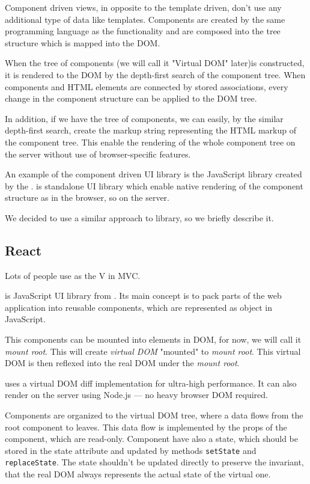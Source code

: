	Component driven views, in opposite to the template driven, don't use any additional type of data like templates. 
	Components are created by the same programming language as the functionality and 
	are composed into the tree structure which is mapped into the DOM. 

	When the tree of components (we will call it "Virtual DOM" later)is constructed, 
	it is rendered to the DOM by the depth-first search of the component tree.
	When components and HTML elements are connected by stored associations, 
	every change in the component structure can be applied to the DOM tree. 

	In addition, if we have the tree of components, we can easily, by the similar depth-first search, 
	create the markup string representing the HTML markup of the component tree.
	This enable the rendering of the whole component tree on the server without use of browser-specific features.

	An example of the component driven UI library is the JavaScript library \react created by the \facebook.
  \react is standalone UI library which enable native rendering of the component structure as in the browser, so on the server.

	We decided to use a similar approach to \react library, so we briefly describe it.

	\subsection{React}\label{subsec:existing-component-react}
		
		Lots of people use \react as the V in MVC.\cite{react}

		\react is JavaScript UI library from \facebook. 
		Its main concept is to pack parts of the web application into reusable components, 
		which are represented as object in JavaScript. 

		This components can be mounted into elements in DOM, for now, we will call it \textit{mount root}. 
		This will create \textit{virtual DOM} "mounted" to \textit{mount root}. 
		This virtual DOM is then reflexed into the real DOM under the \textit{mount root}.

		\react uses a virtual DOM diff implementation for ultra-high performance. 
		It can also render on the server using Node.js — no heavy browser DOM required.\cite{react}

		Components are organized to the virtual DOM tree, where a data flows from the root component to leaves. 
		This data flow is implemented by the props of the component, which are read-only.
		Component have also a state, which should be stored in the state attribute and updated by methods \texttt{setState} and \texttt{replaceState}. 
		The state shouldn't be updated directly to preserve the invariant, that the real DOM always represents the actual state of the virtual one. 

